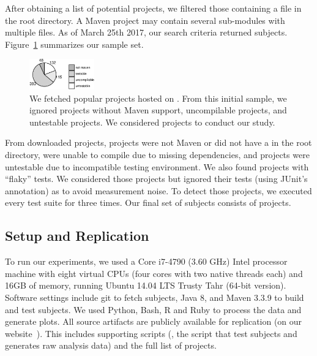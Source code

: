 After obtaining a list of potential projects, we filtered those
containing a \pomf{} file in the root directory.  A Maven project may
contain several sub-modules with multiple \pomf{} files. As of
March 25th 2017, our search criteria returned \SubjectsGithub{}
subjects. Figure~\ref{fig:subjects} summarizes our sample set. 

\begin{figure}[ht]
    \centering
    \includegraphics[width=0.25\textwidth]{plots/subjs.pdf}
    \caption{\label{fig:subjects}We fetched \SubjectsGithub{} popular projects
    hosted on \github{}. From this initial sample, we ignored
    \SubjectsGithubNotMaven{} projects without Maven support,
    \SubjectsGithubNotCompilable{} uncompilable projects, and
    \SubjectsGithubNotTestable{} untestable projects. We considered
    \numSubjs{} projects to conduct our study.}
\end{figure}

From \SubjectsGithub{} downloaded projects, \SubjectsGithubNotMaven{}
projects were not Maven or did not have a \pomf{} in the root
directory, \SubjectsGithubNotCompilable{} were unable to compile due
to missing dependencies, and \SubjectsGithubNotTestable{} projects
were untestable due to incompatible testing environment.  We also
found \SubjectsGithubFlaky{} projects with ``flaky'' tests.  We
considered those projects but ignored their tests (using JUnit's
 annotation) as to avoid measurement noise.  To detect
those projects, we executed every test suite for three times.  Our
final set of subjects consists of \numSubjs{} projects.

\subsection{Setup and Replication}
\label{sec:setup}

To run our experiments, we used a Core i7-4790 (3.60 GHz) Intel
processor machine with eight virtual CPUs (four cores with two native
threads each) and 16GB of memory, running Ubuntu 14.04 LTS Trusty Tahr
(64-bit version).  Software settings include git to fetch
subjects, Java 8, and Maven 3.3.9 to build and test subjects. We used
Python, Bash, R and Ruby to process the
data and generate plots.  All source artifacts are publicly available
for replication (on our website~\cite{ourwebpage}).  This
includes supporting scripts (\eg, the script that test subjects and
generates raw analysis data) and the full list of projects. 


